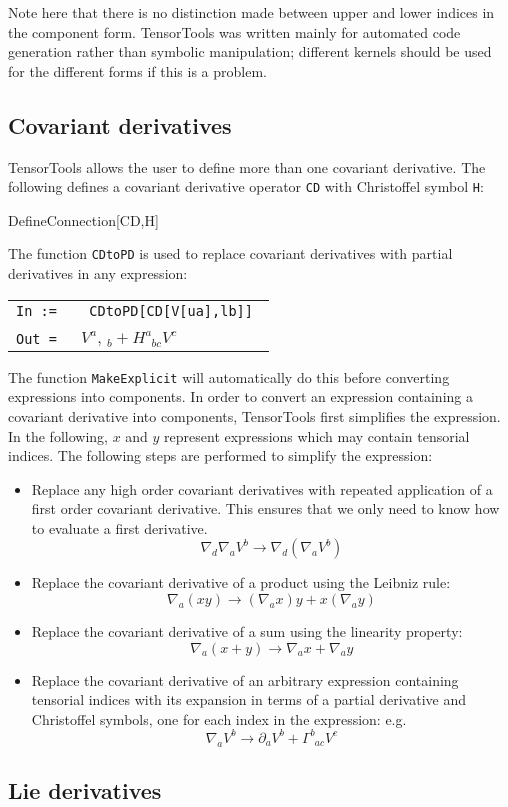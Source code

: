 \documentclass{report}
\newcommand{\mathdialogue}[2]
{
  \begin{center}
  \begin{tabular}[t]{rl}
  {\tt In := } & \parbox{10cm}{\tt {#1}} \\
\\
  {\tt Out = } & \parbox{10cm}{#2} \\
  \end{tabular}
  \end{center}
}
\newcommand{\mathinput}[1]
{
  \begin{tt}
  \begin{center}
    #1
  \end{center}
  \end{tt}
}
\begin{document}
Note here that there is no distinction made between upper and lower
indices in the component form.  TensorTools was written mainly for
automated code generation rather than symbolic manipulation; different
kernels should be used for the different forms if this is a problem.

\subsection{Covariant derivatives}

TensorTools allows the user to define more than one covariant
derivative.  The following defines a covariant derivative operator
{\tt CD} with Christoffel symbol {\tt H}:
%
\mathinput{DefineConnection[CD,H]}
%
The function {\tt CDtoPD} is used to replace covariant derivatives
with partial derivatives in any expression:
%
\mathdialogue
{
  CDtoPD[CD[V[ua],lb]]
}
{
  $V^a,\,_b + H^a_{\phantom{a}bc} V^c$
}
%
The function {\tt MakeExplicit} will automatically do this before
converting expressions into components.  In order to convert an
expression containing a covariant derivative into components,
TensorTools first simplifies the expression.  In the following, $x$
and $y$ represent expressions which may contain tensorial indices. The
following steps are performed to simplify the expression:
\begin{itemize}
\item{Replace any high order covariant derivatives with repeated
application of a first order covariant derivative.  This ensures that
we only need to know how to evaluate a first derivative.
$$\nabla_d \nabla_a V^b \to \nabla_d ( \nabla_a V^b)$$}
\item{Replace the covariant derivative of a product using the Leibniz
rule: $$ \nabla_a (x y) \to (\nabla_a x) y + x (\nabla_a y) $$}
\item{Replace the covariant derivative of a sum using the linearity
property: $$ \nabla_a (x + y) \to \nabla_a x + \nabla_a y $$}
\item{Replace the covariant derivative of an arbitrary expression
containing tensorial indices with its expansion in terms of a
partial derivative and Christoffel symbols, one for each
index in the expression:  e.g.~$$\nabla_a V^b \to \partial_a V^b +
\Gamma^{b}_{\phantom{b}ac} V^c$$ }
\end{itemize}


\subsection{Lie derivatives}
\end{document}
